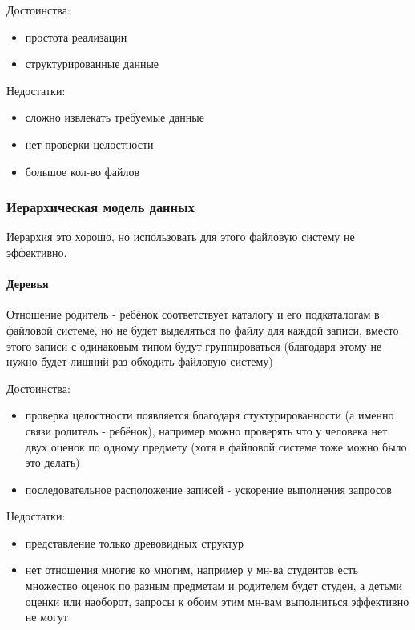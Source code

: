 Достоинства:
\begin{itemize}
    \item простота реализации
    \item структурированные данные
\end{itemize}

Недостатки:
\begin{itemize}
    \item сложно извлекать требуемые данные
    \item нет проверки целостности
    \item большое кол-во файлов
\end{itemize}

\subsubsection{Иерархическая модель данных}
\begin{remark}
    Иерархия это хорошо, но использовать для этого файловую
    систему не эффективно.
\end{remark}

\paragraph{Деревья}
Отношение родитель - ребёнок соответствует каталогу
и его подкаталогам в файловой системе, но не будет
выделяться по файлу для каждой записи, вместо этого
записи с одинаковым типом будут группироваться
(благодаря этому не нужно будет лишний раз обходить
файловую систему)

\enewline

Достоинства:
\begin{itemize}
    \item проверка целостности появляется благодаря
стуктурированности (а именно связи родитель
- ребёнок), например можно проверять что у человека нет
двух оценок по одному предмету (хотя в файловой системе
тоже можно было это делать)
    \item последовательное расположение записей - ускорение
выполнения запросов
\end{itemize}

Недостатки:
\begin{itemize}
    \item представление только древовидных структур
    \item нет отношения многие ко многим, например
у мн-ва студентов есть множество оценок по разным предметам
и родителем будет студен, а детьми оценки или наоборот,
запросы к обоим этим мн-вам выполниться эффективно не могут
\end{itemize}

